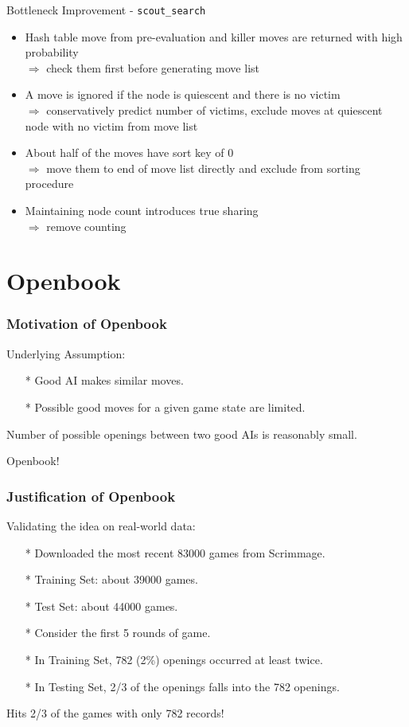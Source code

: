 \documentclass[10pt]{beamer}
\newcommand{\itema}{\item[*]}
\begin{document}
	\begin{frame}{Bottleneck Improvement - \tt{scout\_search}}
	    \begin{itemize}
	        \itema Hash table move from pre-evaluation and killer moves are returned with high probability \\
	        $\Rightarrow$ check them first before generating move list
	        \itema A move is ignored if the node is quiescent and there is no victim\\
	        $\Rightarrow$ conservatively predict number of victims, exclude moves at quiescent node with no victim from move list
	        \itema About half of the moves have sort key of 0 \\
	        $\Rightarrow$ move them to end of move list directly and exclude from sorting procedure
	        \itema Maintaining node count introduces true sharing \\
	        $\Rightarrow$ remove counting
	    \end{itemize}


	\end{frame}
	\section{Openbook}
		\begin{frame}
		\frametitle{Motivation of Openbook}
		Underlying Assumption:
		\begin{itemize}
		\item[*] Good AI makes similar moves.
		\item[*] Possible good moves for a given game state are limited.
		\end{itemize}
		\pause
		Number of possible openings between two good AIs is reasonably small.

		Openbook!
	\end{frame}

	\begin{frame}
		\frametitle{Justification of Openbook}
		Validating the idea on real-world data:\pause
		\begin{itemize}
		\item[*] Downloaded the most recent 83000 games from Scrimmage.
		\item[*] Training Set: about 39000 games.
		\item[*] Test Set: about 44000 games.
		\pause
		\item[*] Consider the first \textcolor{dred}{5} rounds of game.
		\item[*] In Training Set, \textcolor{fgreen}{782} (\textcolor{fgreen}{2\%}) openings occurred at least \textcolor{fgreen}{twice}.
		\item[*] In Testing Set, \textcolor{fgreen}{2/3} of the openings falls into the 782 openings.
		\end{itemize}
		\pause
		Hits \textcolor{fgreen}{2/3} of the games with only \textcolor{fgreen}{782} records!
	\end{frame}
\end{document}
